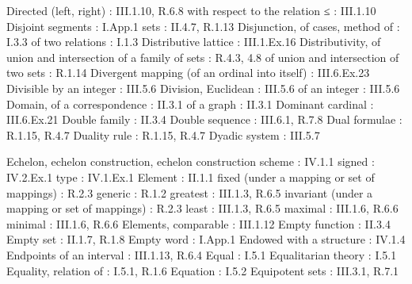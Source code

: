 Directed (left, right) : III.1.10, R.6.8 with respect to the relation ≤ : III.1.10 Disjoint segments : I.App.1 sets : II.4.7, R.1.13 Disjunction, of cases, method of : I.3.3 of two relations : I.1.3 Distributive lattice : III.1.Ex.16 Distributivity, of union and intersection of a family of sets : R.4.3, 4.8 of union and intersection of two sets : R.1.14 Divergent mapping (of an ordinal into itself) : III.6.Ex.23 Divisible by an integer : III.5.6 Division, Euclidean : III.5.6 of an integer : III.5.6 Domain, of a correspondence : II.3.1 of a graph : II.3.1 Dominant cardinal : III.6.Ex.21 Double family : II.3.4 Double sequence : III.6.1, R.7.8 Dual formulae : R.1.15, R.4.7 Duality rule : R.1.15, R.4.7 Dyadic system : III.5.7

Echelon, echelon construction, echelon construction scheme : IV.1.1 signed : IV.2.Ex.1 type : IV.1.Ex.1 Element : II.1.1 fixed (under a mapping or set of mappings) : R.2.3 generic : R.1.2 greatest : III.1.3, R.6.5 invariant (under a mapping or set of mappings) : R.2.3 least : III.1.3, R.6.5 maximal : III.1.6, R.6.6 minimal : III.1.6, R.6.6 Elements, comparable : III.1.12 Empty function : II.3.4 Empty set : II.1.7, R.1.8 Empty word : I.App.1 Endowed with a structure : IV.1.4 Endpoints of an interval : III.1.13, R.6.4 Equal : I.5.1 Equalitarian theory : I.5.1 Equality, relation of : I.5.1, R.1.6 Equation : I.5.2 Equipotent sets : III.3.1, R.7.1

